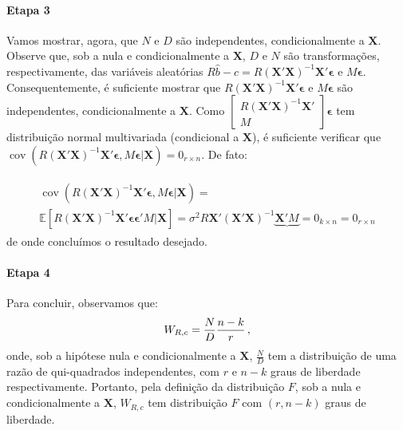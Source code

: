\documentclass[12pt,a4paper]{article}
\begin{document}
\paragraph{Etapa 3} Vamos mostrar, agora, que $N$ e $D$ são independentes, condicionalmente a $\boldsymbol{X}$. Observe que, sob a nula e condicionalmente a $\boldsymbol{X}$, $D$ e $N$ são transformações, respectivamente, das variáveis aleatórias $R\hat{b}-c=R(\boldsymbol{X}'\boldsymbol{X})^{-1}\boldsymbol{X}'\boldsymbol{\epsilon}$ e $M\boldsymbol{\epsilon}$. Consequentemente, é suficiente mostrar que $R(\boldsymbol{X}'\boldsymbol{X})^{-1}\boldsymbol{X}'\boldsymbol{\epsilon}$ e $M\boldsymbol{\epsilon}$ são independentes, condicionalmente a $\boldsymbol{X}$. Como $\begin{bmatrix}
R(\boldsymbol{X}'\boldsymbol{X})^{-1}\boldsymbol{X}' \\
M
\end{bmatrix}\boldsymbol{\epsilon}$ tem distribuição normal multivariada (condicional a $\boldsymbol{X}$), é suficiente verificar que $\operatorname{cov}(R(\boldsymbol{X}'\boldsymbol{X})^{-1}\boldsymbol{X}'\boldsymbol{\epsilon},M\boldsymbol{\epsilon}|\boldsymbol{X}) =0_{r \times n}$. De fato:

\begin{eqnarray*}
	\begin{aligned}
		\operatorname{cov}(R(\boldsymbol{X}'\boldsymbol{X})^{-1}\boldsymbol{X}'\boldsymbol{\epsilon},M\boldsymbol{\epsilon}|\boldsymbol{X}) =\\ \mathbb{E}[R(\boldsymbol{X}'\boldsymbol{X})^{-1}\boldsymbol{X}'\boldsymbol{\epsilon}\boldsymbol{\epsilon}'M|\boldsymbol{X}]=\sigma^2 R\boldsymbol{X}'(\boldsymbol{X}'\boldsymbol{X})^{-1}\underbrace{\boldsymbol{X}'M}={0_{k \times n}} = 0_{r \times n}
	\end{aligned}
\end{eqnarray*}
de onde concluímos o resultado desejado.

\paragraph{Etapa 4} Para concluir, observamos que:
$$\footnotesize W_{R,c} =\frac{N}{D}\frac{n-k}{r}\, ,$$
onde, sob a hipótese nula e condicionalmente a $\boldsymbol{X}$, $\frac{N}{D}$ tem a distribuição de uma razão de qui-quadrados independentes, com $r$ e $n-k$ graus de liberdade respectivamente. Portanto, pela definição da distribuição $F$, sob a nula e condicionalmente a $\boldsymbol{X}$, $W_{R,c}$ tem distribuição $F$ com $(r,n-k)$ graus de liberdade.


	


	
\end{document}
